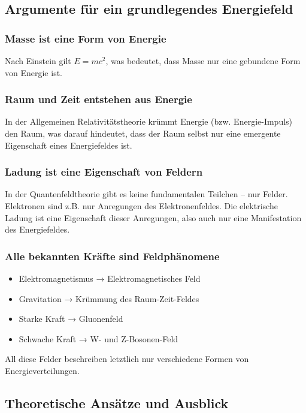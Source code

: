 \documentclass{article}
\begin{document}
\subsection{Argumente für ein grundlegendes Energiefeld}

\subsubsection{Masse ist eine Form von Energie}
Nach Einstein gilt $E = mc^2$, was bedeutet, dass Masse nur eine gebundene Form von Energie ist.

\subsubsection{Raum und Zeit entstehen aus Energie}
In der Allgemeinen Relativitätstheorie krümmt Energie (bzw. Energie-Impuls) den Raum, was darauf hindeutet, dass der Raum selbst nur eine emergente Eigenschaft eines Energiefeldes ist.

\subsubsection{Ladung ist eine Eigenschaft von Feldern}
In der Quantenfeldtheorie gibt es keine fundamentalen Teilchen – nur Felder. Elektronen sind z.B. nur Anregungen des Elektronenfeldes. Die elektrische Ladung ist eine Eigenschaft dieser Anregungen, also auch nur eine Manifestation des Energiefeldes.

\subsubsection{Alle bekannten Kräfte sind Feldphänomene}
\begin{itemize}
	\item Elektromagnetismus → Elektromagnetisches Feld
	\item Gravitation → Krümmung des Raum-Zeit-Feldes
	\item Starke Kraft → Gluonenfeld
	\item Schwache Kraft → W- und Z-Bosonen-Feld
\end{itemize}

All diese Felder beschreiben letztlich nur verschiedene Formen von Energieverteilungen.

\subsection{Theoretische Ansätze und Ausblick}
\end{document}
